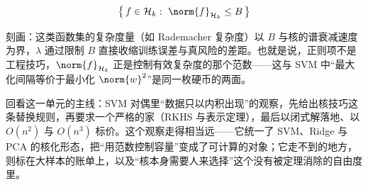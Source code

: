 \[
\bigl\{\,f\in\mathcal{H}_k:\ \norm{f}_{\mathcal{H}_k}\le B\,\bigr\}
\]

刻画：这类函数集的复杂度量（如 Rademacher 复杂度）以 \(B\) 与核的谱衰减速度为界，\(\lambda\) 通过限制 \(B\) 直接收缩训练误差与真风险的差距。也就是说，正则项不是工程技巧，\(\norm{f}_{\mathcal{H}_k}\) 正是控制有效复杂度的那个范数——这与 SVM 中``最大化间隔等价于最小化 \(\norm{w}^{2}\)''是同一枚硬币的两面。

回看这一单元的主线：SVM 对偶里``数据只以内积出现''的观察，先给出核技巧这条替换规则，再要求一个严格的家（RKHS 与表示定理），最后以闭式解落地、以 \(O(n^{2})\) 与 \(O(n^{3})\) 标价。这个观察走得相当远——它统一了 SVM、Ridge 与 PCA 的核化形态，把``用范数控制容量''变成了可计算的对象；它走不到的地方，则标在大样本的账单上，以及``核本身需要人来选择''这个没有被定理消除的自由度里。
